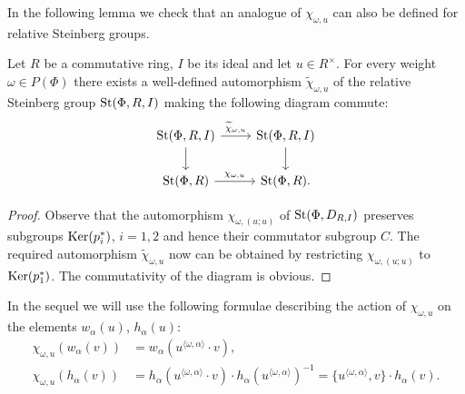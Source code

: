 In the following lemma we check that an analogue of $\chi_{\omega, u}$ can also be defined for relative Steinberg groups.
\begin{lemma} \label{lem:relative-chi}
Let $R$ be a commutative ring, $I$ be its ideal and let $u \in R^\times$.
For every weight $\omega \in P(\Phi)$ there exists a well-defined automorphism $\widetilde{\chi}_{\omega, u}$ of the relative Steinberg group $\operatorname{St}(\Phi, R, I)$ making the following diagram commute:
\[\begin{tikzcd} \St(\Phi, R, I) \ar[r, "\widetilde{\chi}_{\omega, u}"] \ar[d] & \St(\Phi, R, I) \ar[d] \\
\St(\Phi, R) \ar[r, "\chi_{\omega, u}"] & \St(\Phi, R). \end{tikzcd}\]
\end{lemma}
\begin{proof}
    Observe that the automorphism $\chi_{\omega, (u; u)}$ of $\operatorname{St}(\Phi, D_{R, I})$ preserves subgroups
    $\operatorname{Ker}(p_i^*)$, $i=1, 2$ and hence their commutator subgroup $C$.
    The required automorphism $\widetilde{\chi}_{\omega, u}$ now can be obtained by restricting $\chi_{\omega, (u; u)}$ to $\operatorname{Ker}(p_1^*)$.
    The commutativity of the diagram is obvious.
\end{proof}

In the sequel we will use the following formulae describing the action of $\chi_{\omega, u}$ on the elements $w_\alpha(u)$, $h_\alpha(u)$:
\begin{align}
    \label{eq:chi-w} \chi_{\omega, u}\left(w_\alpha(v)\right) &= w_\alpha(u^{\langle \omega, \alpha \rangle} \cdot v), \\
    \label{eq:chi-h} \chi_{\omega, u} (h_\alpha(v)) &= h_\alpha(u^{\langle \omega, \alpha \rangle} \cdot v) \cdot h_\alpha(u^{\langle \omega, \alpha\rangle})^{-1} = \{u^{\langle \omega, \alpha\rangle}, v\} \cdot h_\alpha(v).
\end{align}


